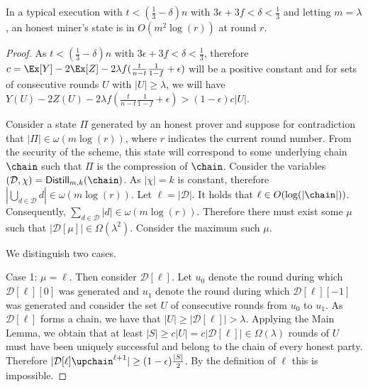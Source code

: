 \begin{theorem}[Succinctness]
	In a typical execution with $t < (\frac{1}{3} - \delta)n$ with
	$3\epsilon + 3f < \delta < \frac{1}{3}$ and letting $m = \lambda$,
	an honest miner's state is in $O(m^2\log(r))$ at round $r$.
\end{theorem}
\begin{proof}
	As $t < (\frac{1}{3} - \delta)n$ with
	$3\epsilon + 3f < \delta < \frac{1}{3}$, therefore
	$c = \Ex[Y] - 2\Ex[Z] - 2\lambda f(\frac{t}{n-t}\frac{1}{1-f} + \epsilon)$ will be
	a positive constant and for sets of consecutive rounds $U$ with
	$|U| \geq \lambda$,
	we will have
	$Y(U) - 2Z(U) - 2\lambda f(\frac{t}{n-t}\frac{1}{1-f} + \epsilon) > (1 - \epsilon)c|U|$.

	Consider a state $\Pi$ generated by an honest prover and suppose for
	contradiction that $|\Pi| \in \omega(m\log(r))$, where $r$ indicates the
	current round number. From the security of the
	scheme, this state will correspond to some underlying chain $\chain$ such that
	$\Pi$ is the compression of $\chain$. Consider the variables
	$(\mathcal{D}, \chi) = \textsf{Distill}_{m,k}(\chain)$. As $|\chi| = k$ is
	constant, therefore $|\bigcup_{d \in \mathcal{D}} d| \in \omega(m\log(r))$.
  Let $\ell = |\mathcal{D}|$.	It holds that $\ell \in O(\log(|\chain|))$.
  Consequently, $\sum_{d \in \mathcal{D}} |d| \in \omega(m\log(r))$. Therefore
  there must exist some $\mu$ such that $|\mathcal{D}[\mu]| \in \Omega(\lambda^2)$.
	Consider the maximum such $\mu$.

	We distinguish two cases.

	Case 1: $\mu = \ell$. Then consider $\mathcal{D}[\ell]$.
	Let $u_0$ denote the round during which $\mathcal{D}[\ell][0]$ was generated
	and $u_1$ denote the round during which $\mathcal{D}[\ell][-1]$ was generated
	and consider the set $U$ of consecutive rounds from $u_0$ to $u_1$. As
	$\mathcal{D}[\ell]$ forms a chain, we have that
	$|U| \geq |\mathcal{D}[\ell]| > \lambda$. Applying the Main Lemma, we obtain
	that at least $|S| \geq c|U| = c|\mathcal{D}[\ell]| \in \Omega(\lambda)$
	rounds of $U$ must have been uniquely successful and belong to the chain of
	every honest party. Therefore $|\mathcal{D}[\ell]\upchain^{\ell+1}| \geq (1 - \epsilon)\frac{|S|}{2}$. By the definition of $\ell$ this is impossible.


\end{proof}
